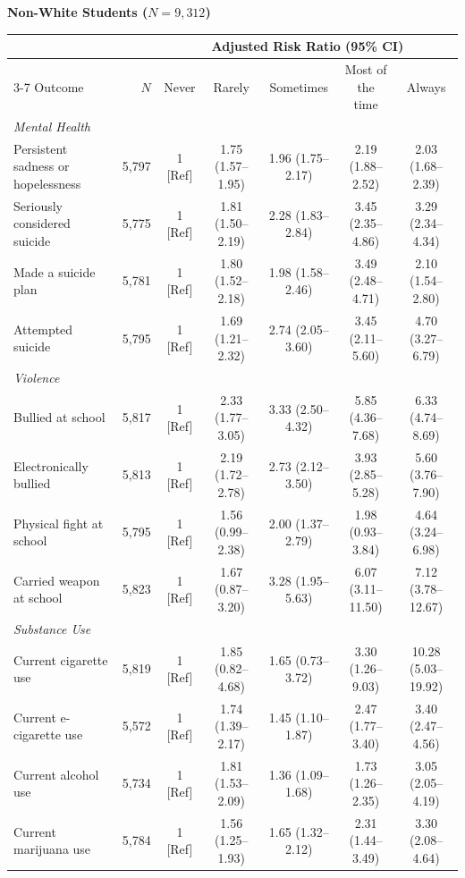 \documentclass[12pt]{article}
\begin{document}
\begin{landscape}
\nobreak\noindent\textbf{Non-White Students ($N = 9,312$)}
\nopagebreak\par\nopagebreak\vspace{1pt}\nopagebreak
\nobreak\noindent\begin{tabular}{l r ccccc}
\toprule
 & & \multicolumn{5}{c}{Adjusted Risk Ratio (95\% CI)} \\
\cmidrule(lr){3-7}
Outcome & $N$ & Never & Rarely & Sometimes & Most of the time & Always \\
\midrule
\textit{Mental Health} \\
\quad Persistent sadness or hopelessness & 5,797 & 1 [Ref] & 1.75 (1.57--1.95) & 1.96 (1.75--2.17) & 2.19 (1.88--2.52) & 2.03 (1.68--2.39) \\
\quad Seriously considered suicide & 5,775 & 1 [Ref] & 1.81 (1.50--2.19) & 2.28 (1.83--2.84) & 3.45 (2.35--4.86) & 3.29 (2.34--4.34) \\
\quad Made a suicide plan & 5,781 & 1 [Ref] & 1.80 (1.52--2.18) & 1.98 (1.58--2.46) & 3.49 (2.48--4.71) & 2.10 (1.54--2.80) \\
\quad Attempted suicide & 5,795 & 1 [Ref] & 1.69 (1.21--2.32) & 2.74 (2.05--3.60) & 3.45 (2.11--5.60) & 4.70 (3.27--6.79) \\
\addlinespace[4pt]
\textit{Violence} \\
\quad Bullied at school & 5,817 & 1 [Ref] & 2.33 (1.77--3.05) & 3.33 (2.50--4.32) & 5.85 (4.36--7.68) & 6.33 (4.74--8.69) \\
\quad Electronically bullied & 5,813 & 1 [Ref] & 2.19 (1.72--2.78) & 2.73 (2.12--3.50) & 3.93 (2.85--5.28) & 5.60 (3.76--7.90) \\
\quad Physical fight at school & 5,795 & 1 [Ref] & 1.56 (0.99--2.38) & 2.00 (1.37--2.79) & 1.98 (0.93--3.84) & 4.64 (3.24--6.98) \\
\quad Carried weapon at school & 5,823 & 1 [Ref] & 1.67 (0.87--3.20) & 3.28 (1.95--5.63) & 6.07 (3.11--11.50) & 7.12 (3.78--12.67) \\
\addlinespace[4pt]
\textit{Substance Use} \\
\quad Current cigarette use & 5,819 & 1 [Ref] & 1.85 (0.82--4.68) & 1.65 (0.73--3.72) & 3.30 (1.26--9.03) & 10.28 (5.03--19.92) \\
\quad Current e-cigarette use & 5,572 & 1 [Ref] & 1.74 (1.39--2.17) & 1.45 (1.10--1.87) & 2.47 (1.77--3.40) & 3.40 (2.47--4.56) \\
\quad Current alcohol use & 5,734 & 1 [Ref] & 1.81 (1.53--2.09) & 1.36 (1.09--1.68) & 1.73 (1.26--2.35) & 3.05 (2.05--4.19) \\
\quad Current marijuana use & 5,784 & 1 [Ref] & 1.56 (1.25--1.93) & 1.65 (1.32--2.12) & 2.31 (1.44--3.49) & 3.30 (2.08--4.64) \\
\bottomrule
\end{tabular}\par\vspace{8pt}


\end{landscape}
\end{document}
